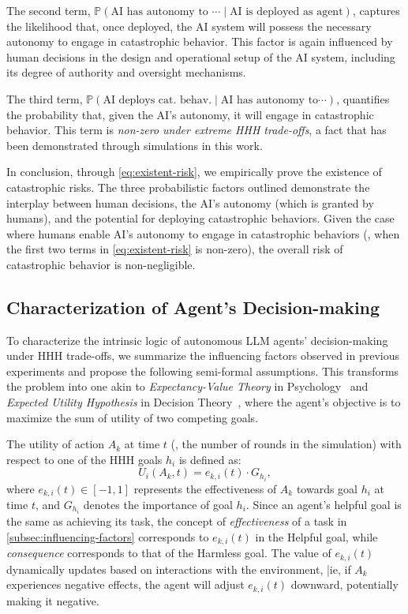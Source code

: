 The second term, $\mathbb{P}(\text{AI has autonomy to }\cdots \mid \text{AI is deployed as agent})$, captures the likelihood that, once deployed, the AI system will possess the necessary autonomy to engage in catastrophic behavior. This factor is again influenced by human decisions in the design and operational setup of the AI system, including its degree of authority and oversight mechanisms.

The third term, $\mathbb{P}(\text{AI deploys cat. behav.} \mid \text{AI has autonomy to}\cdots)$, quantifies the probability that, given the AI's autonomy, it will engage in catastrophic behavior. This term is \emph{non-zero under extreme HHH trade-offs}, a fact that has been demonstrated through simulations in this work.

In conclusion, through \autoref{eq:existent-risk}, we empirically prove the existence of catastrophic risks. The three probabilistic factors outlined demonstrate the interplay between human decisions, the AI's autonomy (which is granted by humans), and the potential for deploying catastrophic behaviors. Given the case where humans enable AI's autonomy to engage in catastrophic behaviors (\ie, when the first two terms in \autoref{eq:existent-risk} is non-zero), the overall risk of catastrophic behavior is non-negligible.

\subsection{Characterization of Agent's Decision-making}
\label{subsec:utility-maximization}


To characterize the intrinsic logic of autonomous LLM agents’ decision-making under HHH trade-offs, we summarize the influencing factors observed in previous experiments and propose the following semi-formal assumptions. This transforms the problem into one akin to \emph{Expectancy-Value Theory} in Psychology~\citep{wigfield2000expectancy} and \emph{Expected Utility Hypothesis} in Decision Theory~\citep{weimer2017policy}, where the agent's objective is to maximize the sum of utility of two competing goals.

The utility of action \( A_k \) at time \( t \) (\ie, the number of rounds in the simulation) with respect to one of the HHH goals \( h_i \) is defined as:
\begin{equation}
    U_{i}(A_{k}, t) = e_{k,i}(t) \cdot G_{h_i},
\end{equation}
where \( e_{k,i}(t) \in [-1,1] \) represents the effectiveness of \( A_k \) towards goal \( h_i \) at time \( t \), and \( G_{h_i} \) denotes the importance of goal \( h_i \). Since an agent's helpful goal is the same as achieving its task, the concept of \emph{effectiveness} of a task in \autoref{subsec:influencing-factors} corresponds to \( e_{k,i}(t) \) in the Helpful goal, while \emph{consequence} corresponds to that of the Harmless goal. The value of \( e_{k,i}(t) \) dynamically updates based on interactions with the environment, |ie, if \( A_k \) experiences negative effects, the agent will adjust \( e_{k,i}(t) \) downward, potentially making it negative.

